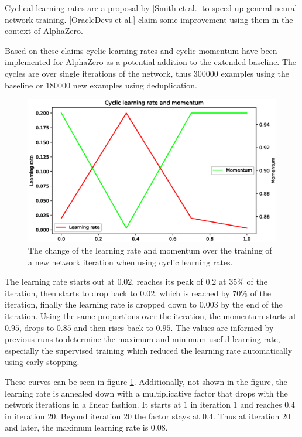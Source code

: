 \documentclass[12pt,onecolumn,oneside,titlepage]{article}
\begin{document}
Cyclical learning rates are a proposal by \cite{smith2017cyclical}[Smith et al.] to speed up general neural network training. \cite{oracledevs6}[OracleDevs et al.] claim some improvement using them in the context of AlphaZero.

Based on these claims cyclic learning rates and cyclic momentum have been implemented for AlphaZero as a potential addition to the extended baseline. The cycles are over single iterations of the network, thus $300000$ examples 
using the baseline or $180000$ new examples using deduplication.


\begin{figure}[H]
\centering
\includegraphics[clip,width=\columnwidth]{cyclic}
\caption{The change of the learning rate and momentum over the training of a new network iteration when using cyclic learning rates.}
\label{fig:cyclic_lr}
\end{figure}

The learning rate starts out at $0.02$, reaches its peak of $0.2$ at $35\%$ of the iteration, then starts to drop back to $0.02$, which is reached by $70\%$ of the iteration, finally the learning rate is dropped down to $0.003$ by the end of the iteration.
Using the same proportions over the iteration, the momentum starts at $0.95$, drops to $0.85$ and then rises back to $0.95$.
The values are informed by previous runs to determine the maximum and minimum useful learning rate, especially the supervised training which reduced the learning rate automatically using early stopping.


These curves can be seen in figure \ref{fig:cyclic_lr}.
Additionally, not shown in the figure, the learning rate is annealed down with a multiplicative factor that drops with the network iterations in a linear fashion. It starts at $1$ in iteration $1$ and reaches $0.4$ in iteration $20$. Beyond iteration $20$ the factor stays at $0.4$.
Thus at iteration $20$ and later, the maximum learning rate is $0.08$.
\end{document}
